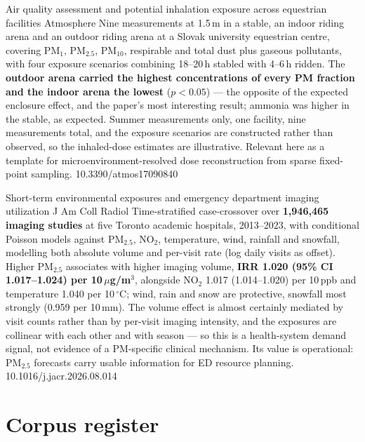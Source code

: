 \documentclass[10pt]{article}
\begin{document}
{Air quality assessment and potential inhalation exposure across equestrian facilities}
{Atmosphere}
{Nine measurements at 1.5\,m in a stable, an indoor riding arena and an outdoor riding
arena at a Slovak university equestrian centre, covering PM$_1$, PM$_{2.5}$, PM$_{10}$,
respirable and total dust plus gaseous pollutants, with four exposure scenarios combining
18--20\,h stabled with 4--6\,h ridden. The \textbf{outdoor arena carried the highest
concentrations of every PM fraction and the indoor arena the lowest} ($p<0.05$) --- the
opposite of the expected enclosure effect, and the paper's most interesting result;
ammonia was higher in the stable, as expected. Summer measurements only, one facility,
nine measurements total, and the exposure scenarios are constructed rather than observed,
so the inhaled-dose estimates are illustrative. Relevant here as a template for
microenvironment-resolved dose reconstruction from sparse fixed-point sampling.}
{10.3390/atmos17090840}


{Short-term environmental exposures and emergency department imaging utilization}
{J Am Coll Radiol}
{Time-stratified case-crossover over \textbf{1{,}946{,}465 imaging studies} at five
Toronto academic hospitals, 2013--2023, with conditional Poisson models against
PM$_{2.5}$, NO$_2$, temperature, wind, rainfall and snowfall, modelling both absolute
volume and per-visit rate (log daily visits as offset). Higher PM$_{2.5}$ associates with
higher imaging volume, \textbf{IRR 1.020 (95\% CI 1.017--1.024) per 10\,$\mu$g/m$^3$},
alongside NO$_2$ 1.017 (1.014--1.020) per 10\,ppb and temperature 1.040 per 10\,$^\circ$C;
wind, rain and snow are protective, snowfall most strongly (0.959 per 10\,mm). The
volume effect is almost certainly mediated by visit counts rather than by per-visit
imaging intensity, and the exposures are collinear with each other and with season ---
so this is a health-system demand signal, not evidence of a PM-specific clinical
mechanism. Its value is operational: PM$_{2.5}$ forecasts carry usable information for ED
resource planning.}
{10.1016/j.jacr.2026.08.014}

\clearpage

\section*{\sffamily\bfseries\color{Deep}Corpus register}
\vspace{-1.5mm}{\color{Amber}\rule{\linewidth}{1.1pt}}\vspace{2.5mm}
\end{document}
